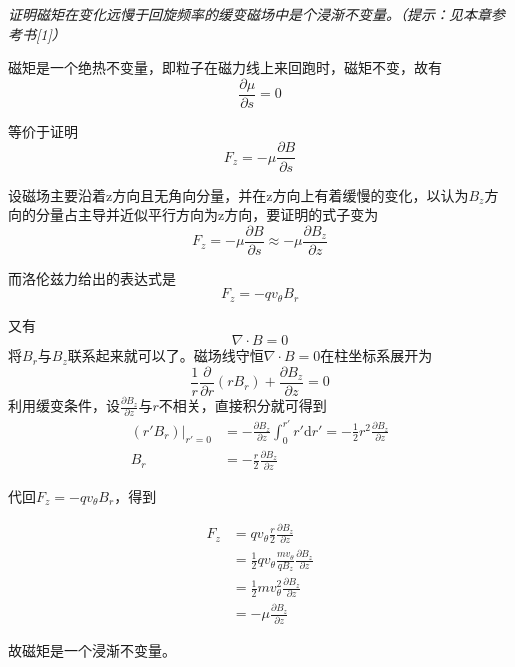 \documentclass{article}
\begin{document}
\emph{证明磁矩在变化远慢于回旋频率的缓变磁场中是个浸渐不变量。（提示：见本章参考书[1]）}

磁矩是一个绝热不变量，即粒子在磁力线上来回跑时，磁矩不变，故有$$\frac{\partial \mu}{\partial s} = 0 $$

等价于证明 $$F_{z} = - \mu \frac{\partial B}{\partial s}$$

设磁场主要沿着z方向且无角向分量，并在z方向上有着缓慢的变化，以认为$B_z$方向的分量占主导并近似平行方向为z方向，要证明的式子变为$$F_{z}=-\mu \frac{\partial B}{\partial s}\approx -\mu \frac{\partial B_{z}}{\partial z}$$

而洛伦兹力给出的表达式是$$ F_{z} =-qv_{\theta }B_{r} $$

又有$$\nabla \cdot B=0 $$将$B_{r} $与$B_{z} $联系起来就可以了。磁场线守恒$\nabla \cdot B=0$在柱坐标系展开为$$\frac{1}{r}\frac{\partial }{\partial r}(rB_{r})+\frac{\partial B_{z}}{\partial z}=0$$
利用缓变条件，设$\frac{\partial B_{z}}{\partial z} $与$r$不相关，直接积分就可得到
\begin{equation*}
    \begin{aligned}
        (r'B_{r})\bigg|_{r'=0} &= -\frac{\partial B_{z}}{\partial z} \int_{0}^{r'} r' \mathrm{d}r' = -\frac{1}{2} r^2 \frac{\partial B_{z}}{\partial z} \\
        B_{r} &= -\frac{r}{2} \frac{\partial B_{z}}{\partial z}
    \end{aligned}
\end{equation*}

代回$F_{z} =-qv_{\theta }B_{r} $，得到

\begin{equation*}
    \begin{aligned}
        F_{z} &= qv_{\theta }\frac{r}{2}\frac{\partial B_{z}}{\partial z} \\
        &= \frac{1}{2} qv_{\theta }\frac{mv_{\theta }}{qB_{z} }\frac{\partial B_{z}}{\partial z} \\
        &= \frac{1}{2} mv_{\theta }^{2}\frac{\partial B_{z}}{\partial z} \\
        &= -\mu  \frac{\partial B_{z}}{\partial z}
    \end{aligned}
\end{equation*}

故磁矩是一个浸渐不变量。
\end{document}
